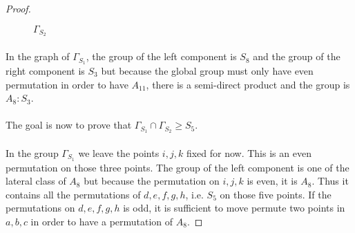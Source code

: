 \begin{proof}
\begin{figure}[H]
\begin{center}
      \caption{$\Gamma_{S_2}$}
    \end{center}
  \end{figure}

  \paragraph{}
  In the graph of $\Gamma_{S_1}$, the group of the left component is $S_8$ and the group of the right component is $S_3$ but because the global group must only have even permutation in order to have $A_{11}$, there is a semi-direct product and the group is $A_8 : S_3$.

  \paragraph{}
  The goal is now to prove that $\Gamma_{S_1} \cap \Gamma_{S_2} \ge S_5$.

  \paragraph{}
  In the group $\Gamma_{S_1}$ we leave the points $i,j,k$ fixed for now. This is an even permutation on those three points. The group of the left component is one of the lateral class of $A_8$ but because the permutation on $i,j,k$ is even, it is $A_8$. Thus it contains all the permutations of $d,e,f,g,h$, i.e. $S_5$ on those five points. If the permutations on $d,e,f,g,h$ is odd, it is sufficient to move permute two points in $a,b,c$ in order to have a permutation of $A_8$.


\end{proof}
